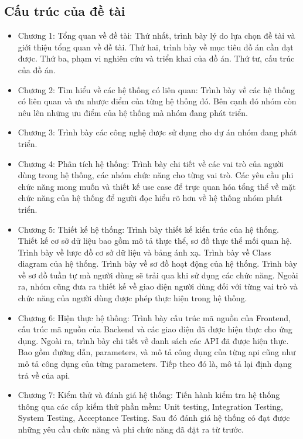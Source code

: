 \subsection{Cấu trúc của đề tài}
\begin{itemize}
  \item Chương 1: Tổng quan về đề tài: Thứ nhất, trình bày lý do lựa chọn đề tài và giới thiệu tổng quan về đề tài. Thứ hai, trình bày về mục tiêu đồ án cần đạt được. Thứ ba, phạm vi nghiên cứu và triển khai của đồ án. Thứ tư,  cấu trúc của đồ án.
    
  \item Chương 2: Tìm hiểu về các hệ thống có liên quan: Trình bày về các hệ thống có liên quan và ưu nhược điểm của từng hệ thống đó. Bên cạnh đó nhóm còn nêu lên những ưu điểm của hệ thống mà nhóm đang phát triển. 
  
  \item Chương 3: Trình bày các công nghệ được sử dụng cho dự án nhóm đang phát triển.

  \item Chương 4: Phân tích hệ thống: Trình bày chi tiết về các vai trò của người dùng trong hệ thống, các nhóm chức năng cho từng vai trò. Các yêu cầu phi chức năng mong muốn và thiết kế use case để trực quan hóa tổng thể về mặt chức năng của hệ thống để người đọc hiểu rõ hơn về hệ thống nhóm phát triển.

  \item Chương 5: Thiết kế hệ thống: Trình bày thiết kế kiến trúc của hệ thống. Thiết kế cơ sở dữ liệu bao gồm mô tả thực thể, sơ đồ thực thể mối quan hệ. Trình bày về lược đồ cơ sở dữ liệu và bảng ánh xạ. Trình bày về Class diagram của hệ thống. Trình bày về sơ đồ hoạt động của hệ thống. Trình bày về sơ đồ tuần tự mà người dùng sẽ trải qua khi sử dụng các chức năng. Ngoài ra, nhóm cũng đưa ra thiết kế về giao diện người dùng đối với từng vai trò và chức năng của người dùng được phép thực hiện trong hệ thống.
  
  \item Chương 6: Hiện thực hệ thống: Trình bày cấu trúc mã nguồn của Frontend, cấu trúc mã nguồn của Backend và các giao diện đã được hiện thực cho ứng dụng. Ngoài ra, trình bày chi tiết về danh sách các API đã được hiện thực. Bao gồm đường dẫn, parameters, và mô tả công dụng của từng api cũng như mô tả công dụng của từng parameters. Tiếp theo đó là, mô tả lại định dạng trả về của api.
  
  \item Chương 7: Kiểm thử và đánh giá hệ thống: Tiến hành kiểm tra hệ thống thông qua các cấp kiểm thử phần mềm: Unit testing, Integration Testing, System Testing, Acceptance Testing. Sau đó đánh giá hệ thống có đạt được những yêu cầu chức năng và phi chức năng đã đặt ra từ trước.
  

\end{itemize}
